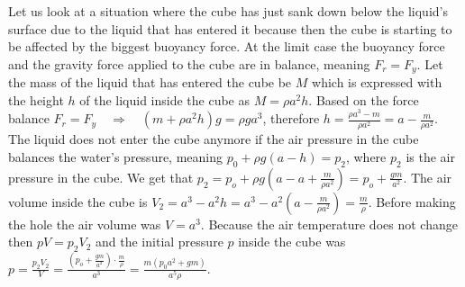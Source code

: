 {\ifEngSolution
Let us look at a situation where the cube has just sank down below the liquid’s surface due to the liquid that has entered it because then the cube is starting to be affected by the biggest buoyancy force. At the limit case the buoyancy force and the gravity force applied to the cube are in balance, meaning $F_r = F_y$. Let the mass of the liquid that has entered the cube be $M$ which is expressed with the height $h$ of the liquid inside the cube as $M = \rho a^2h$. Based on the force balance $F_r = F_y \quad\Rightarrow\quad (m + \rho a^2h)g=\rho ga^3$, therefore $h = \frac{\rho a^3 - m}{\rho a^2} = a - \frac{m}{\rho a^2}$. The liquid does not enter the cube anymore if the air pressure in the cube balances the water’s pressure, meaning $p_0 + \rho g(a-h) = p_2$, where $p_2$ is the air pressure in the cube. We get that $p_2 = p_o + \rho g\left(a - a + \frac{m}{\rho a^2}\right) = p_o +  \frac{gm}{a^2}$. The air volume inside the cube is $V_2 = a^3 - a^2h = a^3 - a^2\left(a - \frac{m}{\rho a^2}\right) = \frac{m}{\rho}$. Before making the hole the air volume was $V=a^3$. Because the air temperature does not change then $pV = p_2V_2$ and the initial pressure $p$ inside the cube was $p = \frac{p_2V_2}{V} = \frac{ \left( p_o +  \frac{gm}{a^2} \right) \cdot \frac{m}{\rho}}{a^3} = \frac{m(p_0a^2 + gm)}{a^5\rho}$.
\fi
}